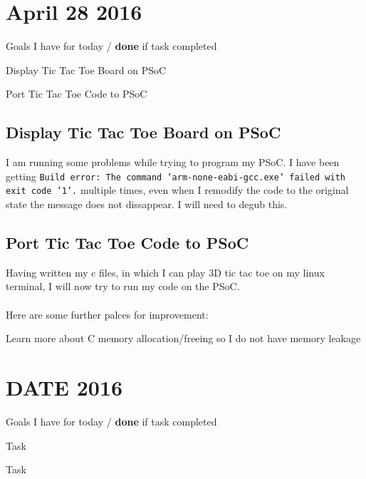 \documentclass[12pt,twoside]{article}
\newenvironment{tight_itemize}{
\begin{itemize}
  \setlength{\itemsep}{0pt}
  \setlength{\parskip}{0pt}
}{\end{itemize}}
\begin{document}

\newpage
\section{April 28 2016}

Goals I have for today / {\bf done} if task completed
\begin{tight_itemize}
\item Display Tic Tac Toe Board on PSoC
\item Port Tic Tac Toe Code to PSoC
\end{tight_itemize}

\subsection{Display Tic Tac Toe Board on PSoC}
I am running some problems while trying to program my PSoC. I have been getting \texttt{Build error: The command 'arm-none-eabi-gcc.exe' failed with exit code '1'.} multiple times, even when I remodify the code to the original state the message does not dissappear. I will need to degub this.

\subsection{Port Tic Tac Toe Code to PSoC}
Having written my c files, in which I can play 3D tic tac toe on my linux terminal, I will now try to run my code on the PSoC.
\\
\\ Here are some further palces for improvement:
\begin{tight_itemize}
\item Learn more about C memory allocation/freeing so I do not have memory leakage
\end{tight_itemize}


\newpage
\section{DATE 2016}

Goals I have for today / {\bf done} if task completed
\begin{tight_itemize}
\item Task %
\item Task 
\end{tight_itemize}
\end{document}
